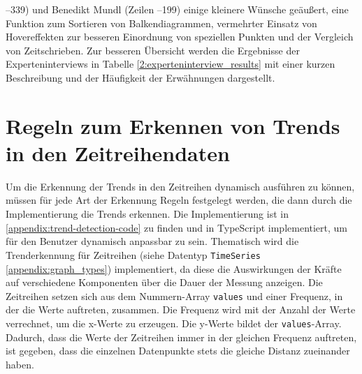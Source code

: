 --339) und Benedikt Mundl (Zeilen --199) einige kleinere Wünsche geäußert, eine Funktion zum Sortieren von Balkendiagrammen, vermehrter Einsatz von Hovereffekten zur besseren Einordnung von speziellen Punkten und der Vergleich von Zeitschrieben. Zur besseren Übersicht werden die Ergebnisse der Experteninterviews in Tabelle \ref{2:experteninterview_results} mit einer kurzen Beschreibung und der Häufigkeit der Erwähnungen dargestellt.
\newpage

\newpage

\section{Regeln zum Erkennen von Trends in den Zeitreihendaten}
Um die Erkennung der Trends in den Zeitreihen dynamisch ausführen zu können, müssen für jede Art der Erkennung Regeln festgelegt werden, die dann durch die Implementierung die Trends erkennen. Die Implementierung ist in \ref{appendix:trend-detection-code} zu finden und in TypeScript implementiert, um für den Benutzer dynamisch anpassbar zu sein. Thematisch wird die Trenderkennung für Zeitreihen (siehe Datentyp \texttt{TimeSeries} \ref{appendix:graph_types}) implementiert, da diese die Auswirkungen der Kräfte auf verschiedene Komponenten über die Dauer der Messung anzeigen. Die Zeitreihen setzen sich aus dem Nummern-Array \texttt{values} und einer Frequenz, in der die Werte auftreten, zusammen. Die Frequenz wird mit der Anzahl der Werte verrechnet, um die x-Werte zu erzeugen. Die y-Werte bildet der \texttt{values}-Array. Dadurch, dass die Werte der Zeitreihen immer in der gleichen Frequenz auftreten, ist gegeben, dass die einzelnen Datenpunkte stets die gleiche Distanz zueinander haben.
